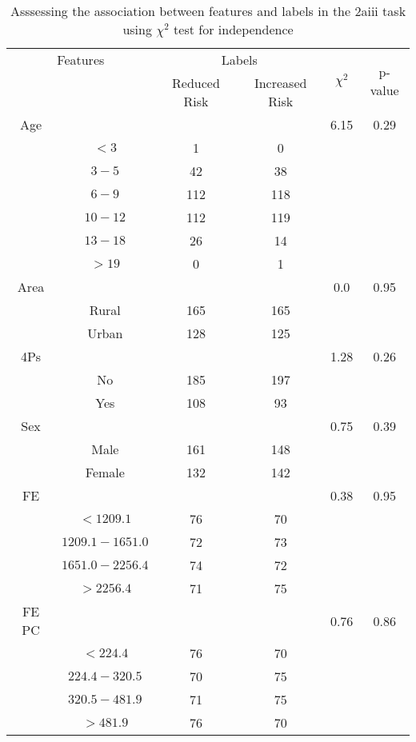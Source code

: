 \begin{table}[!htb]
\centering
\caption{Asssessing the association between features and labels in the 2aiii task using $\chi^2$ test for independence}
\label{tab:chitest_2aiii}
\begin{tabular}{c c | c c| c | c}
\hline
\multicolumn{2}{c|}{Features}& \multicolumn{2}{c|}{Labels}& \multirow{2}{*}{$\chi^2$} & \multirow{2}{*}{p-value}\\ 
& & Reduced Risk & Increased Risk & & \\ 
\hline
Age &  &  & & 6.15 & 0.29 \\ 
& $< 3$ & 1 & 0& & \\ 
& $3-5$ & 42 & 38& & \\ 
& $6-9$ & 112 & 118& & \\ 
& $10-12$ & 112 & 119& & \\ 
& $13-18$ & 26 & 14& & \\ 
& $> 19$ & 0 & 1& & \\ 
\hline 
Area &  &  & & 0.0 & 0.95 \\ 
& Rural & 165 & 165& & \\ 
& Urban & 128 & 125& & \\ 
\hline 
4Ps &  &  & & 1.28 & 0.26 \\ 
& No & 185 & 197& & \\ 
& Yes & 108 & 93& & \\ 
\hline 
Sex &  &  & & 0.75 & 0.39 \\ 
& Male & 161 & 148& & \\ 
& Female & 132 & 142& & \\ 
\hline 
FE &  &  & & 0.38 & 0.95 \\ 
& $< 1209.1$ & 76 & 70& & \\ 
& $1209.1-1651.0$ & 72 & 73& & \\ 
& $1651.0-2256.4$ & 74 & 72& & \\ 
& $> 2256.4$ & 71 & 75& & \\ 
\hline 
FE PC &  &  & & 0.76 & 0.86 \\ 
& $< 224.4$ & 76 & 70& & \\ 
& $224.4-320.5$ & 70 & 75& & \\ 
& $320.5-481.9$ & 71 & 75& & \\ 
& $> 481.9$ & 76 & 70& & \\ 
\hline 
\end{tabular}
\end{table}
